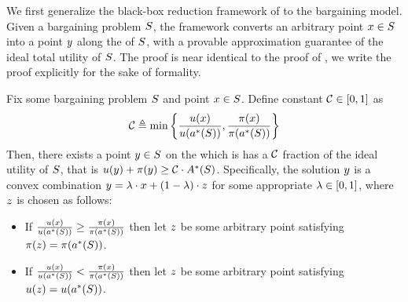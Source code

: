 {We first} generalize the black-box reduction framework of  to the bargaining model. Given a bargaining problem $S$, the framework converts an arbitrary point $x\in S$ into a point $y$ along the {\ksline} of $S$, with a provable approximation guarantee of the ideal {total} utility of $S$. The proof is near identical to the proof of , we write the proof explicitly for the sake of formality.

\begin{theorem}
    \label{lemma:bargaining:blackbox reduction}
    Fix some bargaining problem $S$ and point $x\in S$. Define constant $\mathcal{C}\in[0,1]$ as
    \begin{align*}
        \mathcal{C} \triangleq \min\left\{
        \frac{u(x)}{u(a^*(S))},
        \frac{\pi(x)}{\pi(a^*(S))}
        \right\}
    \end{align*}
    Then, there exists a point $y\in S$ on the {\ksline} which is has a $\mathcal{C}$ fraction of the ideal utility of $S$, that is $u(y) + \pi(y) \geq \mathcal{C}\cdot A^*(S)$. Specifically, the solution $y$ is a convex combination $y=\lambda \cdot x + (1-\lambda) \cdot z$ for some appropriate $\lambda\in[0, 1]$, where $z$ is chosen as follows:
    \begin{itemize}
        \item If $\frac{u(x)}{u(a^*(S))} \geq \frac{\pi(x)}{\pi(a^*(S))}$ then let $z$ be some arbitrary point satisfying $\pi(z) = \pi(a^*(S))$.
        \item If $\frac{u(x)}{u(a^*(S))} < \frac{\pi(x)}{\pi(a^*(S))}$ then let $z$ be some arbitrary point satisfying $u(z) = u(a^*(S))$.
    \end{itemize}
\end{theorem}

